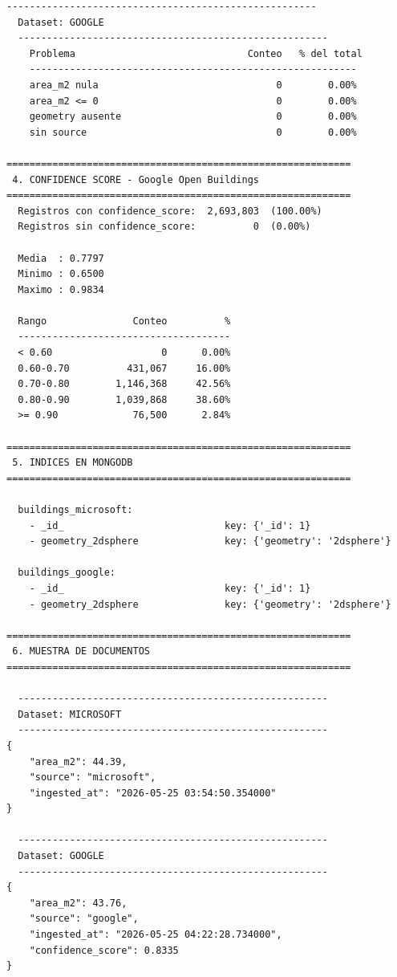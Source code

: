 \documentclass[12pt,a4paper]{article}
\begin{document}
\begin{lstlisting}[style=evidence]
  ------------------------------------------------------
  Dataset: GOOGLE
  ------------------------------------------------------
    Problema                              Conteo   % del total
    ---------------------------------------------------------
    area_m2 nula                               0        0.00%
    area_m2 <= 0                               0        0.00%
    geometry ausente                           0        0.00%
    sin source                                 0        0.00%

============================================================
 4. CONFIDENCE SCORE - Google Open Buildings
============================================================
  Registros con confidence_score:  2,693,803  (100.00%)
  Registros sin confidence_score:          0  (0.00%)

  Media  : 0.7797
  Minimo : 0.6500
  Maximo : 0.9834

  Rango               Conteo          %
  -------------------------------------
  < 0.60                   0      0.00%
  0.60-0.70          431,067     16.00%
  0.70-0.80        1,146,368     42.56%
  0.80-0.90        1,039,868     38.60%
  >= 0.90             76,500      2.84%

============================================================
 5. INDICES EN MONGODB
============================================================

  buildings_microsoft:
    - _id_                            key: {'_id': 1}
    - geometry_2dsphere               key: {'geometry': '2dsphere'}

  buildings_google:
    - _id_                            key: {'_id': 1}
    - geometry_2dsphere               key: {'geometry': '2dsphere'}

============================================================
 6. MUESTRA DE DOCUMENTOS
============================================================

  ------------------------------------------------------
  Dataset: MICROSOFT
  ------------------------------------------------------
{
    "area_m2": 44.39,
    "source": "microsoft",
    "ingested_at": "2026-05-25 03:54:50.354000"
}

  ------------------------------------------------------
  Dataset: GOOGLE
  ------------------------------------------------------
{
    "area_m2": 43.76,
    "source": "google",
    "ingested_at": "2026-05-25 04:22:28.734000",
    "confidence_score": 0.8335
}


\end{lstlisting}
\end{document}
